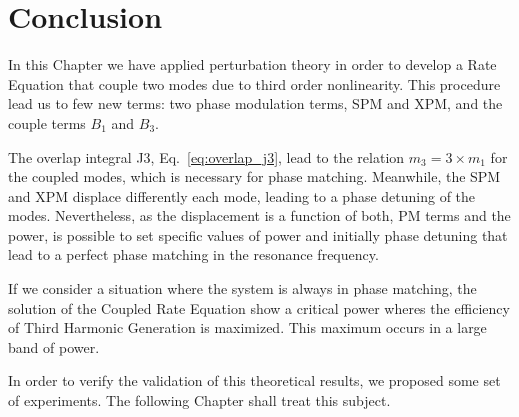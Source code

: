 \section{Conclusion}

In this Chapter we have applied perturbation theory in order to develop a Rate Equation that couple two modes due to third order nonlinearity. This procedure lead us to few new terms: two phase modulation terms, SPM and XPM, and the couple terms $B_1$ and $B_3$.

The overlap integral J3, Eq.~\ref{eq:overlap_j3}, lead to the relation $m_3 = 3\times m_1$ for the coupled modes, which is necessary for phase matching. Meanwhile, the SPM and XPM displace differently each mode, leading to a phase detuning of the modes. Nevertheless, as the displacement is a function of both, PM terms and the power, is possible to set specific values of power and initially phase detuning that lead to a perfect phase matching in the resonance frequency. 

If we consider a situation where the system is always in phase matching, the solution of the Coupled Rate Equation show a critical power wheres the efficiency of Third Harmonic Generation is maximized. This maximum occurs in a large band of power.

In order to verify the validation of this theoretical results, we proposed some set of experiments. The following Chapter shall treat this subject.  